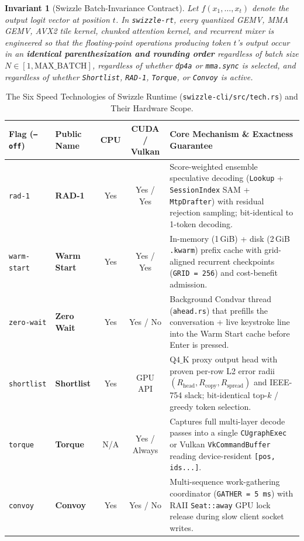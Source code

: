 \documentclass[10pt,a4paper]{article}
\theoremstyle{swzstyle}
\newtheorem{invariant}[theorem]{Invariant}
\newcommand{\code}[1]{\texttt{#1}}
\begin{document}
\begin{invariant}[Swizzle Batch-Invariance Contract]
Let $f(x_1, \dots, x_t)$ denote the output logit vector at position $t$. In \texttt{swizzle-rt}, every quantized GEMV, MMA GEMV, AVX2 tile kernel, chunked attention kernel, and recurrent mixer is engineered so that the floating-point operations producing token $t$'s output occur in an \textbf{identical parenthesization and rounding order} regardless of batch size $N \in [1, \text{MAX\_BATCH}]$, regardless of whether \texttt{dp4a} or \texttt{mma.sync} is selected, and regardless of whether \texttt{Shortlist}, \texttt{RAD-1}, \texttt{Torque}, or \texttt{Convoy} is active.
\end{invariant}

\begin{table}[htbp]
  \centering
  \caption{The Six Speed Technologies of Swizzle Runtime (\texttt{swizzle-cli/src/tech.rs}) and Their Hardware Scope.}
  \label{tab:six_technologies}
  \small
  \begin{tabularx}{\textwidth}{@{}llccX@{}}
    \toprule
    \sffamily\bfseries Flag (\texttt{--off}) & \sffamily\bfseries Public Name & \sffamily\bfseries CPU & \sffamily\bfseries CUDA / Vulkan & \sffamily\bfseries Core Mechanism \& Exactness Guarantee \\
    \midrule
    \code{rad-1} & \textbf{RAD-1} & Yes & Yes / Yes & Score-weighted ensemble speculative decoding (\code{Lookup} + \code{SessionIndex} SAM + \code{MtpDrafter}) with residual rejection sampling; bit-identical to 1-token decoding. \\
    \code{warm-start} & \textbf{Warm Start} & Yes & Yes / Yes & In-memory (1\,GiB) + disk (2\,GiB \code{.kwarm}) prefix cache with grid-aligned recurrent checkpoints (\code{GRID = 256}) and cost-benefit admission. \\
    \code{zero-wait} & \textbf{Zero Wait} & Yes & Yes / No & Background Condvar thread (\code{ahead.rs}) that prefills the conversation + live keystroke line into the Warm Start cache before Enter is pressed. \\
    \code{shortlist} & \textbf{Shortlist} & Yes & GPU API & $\text{Q4\_K}$ proxy output head with proven per-row L2 error radii $(R_{\text{head}}, R_{\text{copy}}, R_{\text{spread}})$ and IEEE-754 slack; bit-identical top-$k$ / greedy token selection. \\
    \code{torque} & \textbf{Torque} & N/A & Yes / Always & Captures full multi-layer decode passes into a single \code{CUgraphExec} or Vulkan \code{VkCommandBuffer} reading device-resident \code{[pos, ids...]}. \\
    \code{convoy} & \textbf{Convoy} & Yes & Yes / No & Multi-sequence work-gathering coordinator (\code{GATHER = 5\,ms}) with RAII \code{Seat::away} GPU lock release during slow client socket writes. \\
    \bottomrule
  \end{tabularx}
\end{table}
\end{document}
